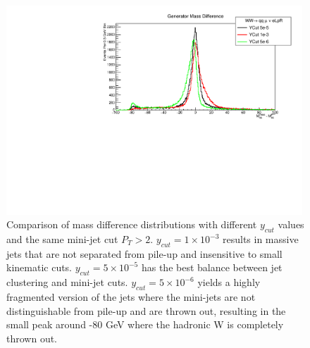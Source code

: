 \begin{figure}
    \centering
    \begin{minipage}{0.49\textwidth}
        \centering
        
        \includegraphics[width=0.99\textwidth]{SupDiff.pdf} %
        \caption{Comparison of mass difference distributions with different $y_{cut}$ values and the same mini-jet cut $P_T > 2$. $y_{cut} = 1\times 10^{-3}$ results in massive jets that are not separated from pile-up and insensitive to small kinematic cuts. $y_{cut} = 5\times 10^{-5}$ has the best balance between jet clustering and mini-jet cuts. $y_{cut} = 5\times 10^{-6}$ yields a highly fragmented version of the jets where the mini-jets are not distinguishable from pile-up and are thrown out, resulting in the small peak around -80 GeV where the hadronic W is completely thrown out.  }
        \label{fig:supdiff}
    \end{minipage}\hfill
    \begin{minipage}{0.49\textwidth}
        \centering
        

\end{minipage}
\end{figure}
